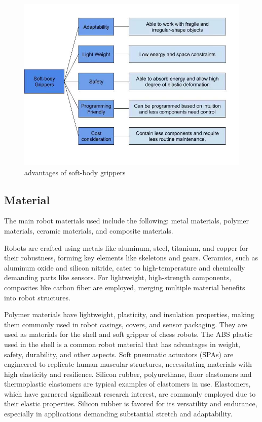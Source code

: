\documentclass[10pt, a4paper, twocolumn]{article}
\begin{document}
\begin{figure}
    \centering
    \includegraphics[width=1\linewidth]{advantages of soft-body grippers.jpg}
    \caption{advantages of soft-body grippers}
    \label{fig:advantages of soft-body grippers}
\end{figure}

\subsection{Material}
The main robot materials used include the following: metal materials, polymer materials, ceramic materials, and composite materials.

Robots are crafted using metals like aluminum, steel, titanium, and copper for their robustness, forming key elements like skeletons and gears. Ceramics, such as aluminum oxide and silicon nitride, cater to high-temperature and chemically demanding parts like sensors. For lightweight, high-strength components, composites like carbon fiber are employed, merging multiple material benefits into robot structures.\cite{nelson_csc297_materials}

Polymer materials have lightweight, plasticity, and insulation properties, making them commonly used in robot casings, covers, and sensor packaging. They are used as materials for the shell and soft gripper of chess robots. The ABS plastic used in the shell is a common robot material that has advantages in weight, safety, durability, and other aspects. Soft pneumatic actuators (SPAs) are engineered to replicate human muscular structures, necessitating materials with high elasticity and resilience\cite{Rus2015}. Silicon rubber, polyurethane, fluor elastomers and thermoplastic elastomers are typical examples of elastomers in use.  Elastomers, which have garnered significant research interest\cite{Moseley2016}, are commonly employed due to their elastic properties. Silicon rubber is favored for its versatility and endurance, especially in applications demanding substantial stretch and adaptability\cite{Xavier2022}.
\end{document}
